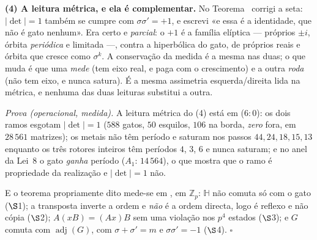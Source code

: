 \documentclass[livro.tex]{subfiles}
\begin{document}
\begin{teorema}
\textbf{(4) A leitura métrica, e ela é complementar.} No
Teorema~ corrigi a seta: $|\det|=1$ também se cumpre com
$\sigma\sigma'=+1$, e escrevi «e essa é a identidade, que não é gato
nenhum». Era certo e \emph{parcial}: o $+1$ é a família elíptica ---
próprios $\pm i$, órbita \emph{periódica} e limitada ---, contra a
hiperbólica do gato, de próprios reais e órbita que cresce como
$\sigma^{k}$. A conservação da medida é a mesma nas duas; o que muda é
que uma \emph{mede} (tem eixo real, e paga com o crescimento) e a outra
\emph{roda} (não tem eixo, e nunca satura). É a mesma assimetria
esquerda/direita lida na métrica, e nenhuma das duas leituras substitui
a outra.

\emph{Prova (operacional, medida).} A leitura métrica do (4) está em
 ($6{:}0$): os dois ramos esgotam $|\det|=1$ ($588$
gatos, $50$ esquilos, $106$ na borda, \emph{zero} fora, em $28\,561$
matrizes); os metais não têm período e saturam nos passos $44,24,18,15,13$
enquanto os três rotores inteiros têm períodos $4$, $3$, $6$ e nunca
saturam; e no anel da Lei~8 o gato \emph{ganha} período ($A_1$: $14\,564$),
o que mostra que o ramo é propriedade da realização e $|\det|=1$ não.

E o teorema propriamente dito mede-se em , em
$\mathbb{Z}_p$: $\mathbb{H}$ não comuta só com o gato ($\S$1); a
transposta inverte a ordem e \emph{não} é a ordem directa, logo é reflexo
e não cópia ($\S$2); $A(xB)=(Ax)B$ sem uma violação nos $p^{4}$ estados
($\S$3); e $G$ comuta com $\operatorname{adj}(G)$, com
$\sigma+\sigma'=m$ e $\sigma\sigma'=-1$ ($\S$4). $\square$
\end{teorema}
\end{document}
